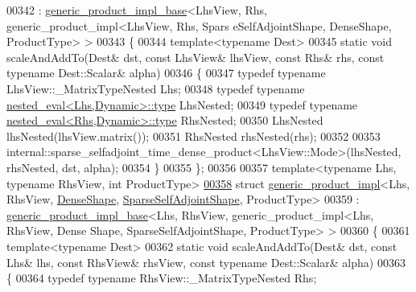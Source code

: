 \begin{DoxyCode}
00342 : \hyperlink{struct_eigen_1_1internal_1_1generic__product__impl__base}{generic\_product\_impl\_base}<LhsView, Rhs, generic\_product\_impl<LhsView, Rhs, Spars
      eSelfAdjointShape, DenseShape, ProductType> >
00343 \{
00344   \textcolor{keyword}{template}<\textcolor{keyword}{typename} Dest>
00345   \textcolor{keyword}{static} \textcolor{keywordtype}{void} scaleAndAddTo(Dest& dst, \textcolor{keyword}{const} LhsView& lhsView, \textcolor{keyword}{const} Rhs& rhs, \textcolor{keyword}{const} \textcolor{keyword}{typename} Dest::Scalar&
       alpha)
00346   \{
00347     \textcolor{keyword}{typedef} \textcolor{keyword}{typename} LhsView::\_MatrixTypeNested Lhs;
00348     \textcolor{keyword}{typedef} \textcolor{keyword}{typename} \hyperlink{class_eigen_1_1internal_1_1_tensor_lazy_evaluator_writable}{nested\_eval<Lhs,Dynamic>::type} LhsNested;
00349     \textcolor{keyword}{typedef} \textcolor{keyword}{typename} \hyperlink{class_eigen_1_1internal_1_1_tensor_lazy_evaluator_writable}{nested\_eval<Rhs,Dynamic>::type} RhsNested;
00350     LhsNested lhsNested(lhsView.matrix());
00351     RhsNested rhsNested(rhs);
00352     
00353     internal::sparse\_selfadjoint\_time\_dense\_product<LhsView::Mode>(lhsNested, rhsNested, dst, alpha);
00354   \}
00355 \};
00356 
00357 \textcolor{keyword}{template}<\textcolor{keyword}{typename} Lhs, \textcolor{keyword}{typename} RhsView, \textcolor{keywordtype}{int} ProductType>
\hyperlink{struct_eigen_1_1internal_1_1generic__product__impl_3_01_lhs_00_01_rhs_view_00_01_dense_shape_00_97d81d328d4cc9ddd79aee8e69e68494}{00358} \textcolor{keyword}{struct }\hyperlink{struct_eigen_1_1internal_1_1generic__product__impl}{generic\_product\_impl}<Lhs, RhsView, \hyperlink{struct_eigen_1_1_dense_shape}{DenseShape}, 
      \hyperlink{struct_eigen_1_1internal_1_1_sparse_self_adjoint_shape}{SparseSelfAdjointShape}, ProductType>
00359 : \hyperlink{struct_eigen_1_1internal_1_1generic__product__impl__base}{generic\_product\_impl\_base}<Lhs, RhsView, generic\_product\_impl<Lhs, RhsView, Dense
      Shape, SparseSelfAdjointShape, ProductType> >
00360 \{
00361   \textcolor{keyword}{template}<\textcolor{keyword}{typename} Dest>
00362   \textcolor{keyword}{static} \textcolor{keywordtype}{void} scaleAndAddTo(Dest& dst, \textcolor{keyword}{const} Lhs& lhs, \textcolor{keyword}{const} RhsView& rhsView, \textcolor{keyword}{const} \textcolor{keyword}{typename} Dest::Scalar&
       alpha)
00363   \{
00364     \textcolor{keyword}{typedef} \textcolor{keyword}{typename} RhsView::\_MatrixTypeNested Rhs;

\end{DoxyCode}
